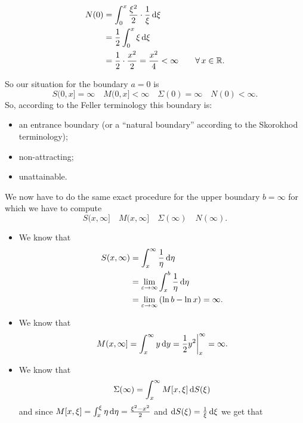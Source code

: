 \documentclass[12pt]{article}
\begin{document}
\begin{enumerate}
\begin{itemize}
			\begin{align*}
				N(0)&=\int_{0}^{x}\frac{\xi^{2}}{2}\cdot\frac{1}{\xi}\mathop{}\!\mathrm{d}\xi\\
				&=\frac{1}{2}\int_{0}^{x}\xi\mathop{}\!\mathrm{d}\xi\\
				&=\frac{1}{2}\cdot\frac{x^{2}}{2}=\frac{x^{2}}{4}<\infty\qquad \forall\, x\in\mathbb{R}.
			\end{align*}
		\end{itemize}
		So our situation for the boundary $a=0$ is
		\begin{equation*}
			S(0,x]=\infty\quad M(0,x]<\infty\quad \Sigma(0)=\infty \quad N(0)<\infty.
		\end{equation*}
		So, according to the Feller terminology this boundary is:
		\begin{itemize}[$\diamond$]
			\item an entrance boundary (or a ``natural boundary'' according to the Skorokhod terminology);
			\item non-attracting;
			\item unattainable.
		\end{itemize}
		We now have to do the same exact procedure for the upper boundary $b=\infty$ for which we have to compute
		\begin{equation*}
			S(x,\infty]\quad M(x,\infty]\quad \Sigma(\infty) \quad N(\infty).
		\end{equation*}
		\begin{itemize}
			\item  We know that 
			\begin{align*}
				S(x,\infty)&=\int_{x}^{\infty}\frac{1}{\eta}\mathop{}\!\mathrm{d}\eta\\
				&=\lim_{\varepsilon\to\infty}\int_{x}^{b}\frac{1}{\eta}\mathop{}\!\mathrm{d}\eta\\
				&=\lim_{\varepsilon\to\infty}\left(\ln b-\ln x\right)=\infty.
			\end{align*}
			\item We know that 
			\begin{equation*}
				M(x,\infty]=\int_{x}^{\infty}y\mathop{}\!\mathrm{d} y=\frac{1}{2} y^{2}\bigg|^{\infty}_{x}=\infty.
			\end{equation*}
			\item We know that
			\begin{equation*}
				\Sigma(\infty)=\int_{x}^{\infty}M[x,\xi]\mathop{}\!\mathrm{d} S(\xi)
			\end{equation*}
			and since $M[x,\xi]=\int_{x}^{\xi}\eta\mathop{}\!\mathrm{d}\eta=\frac{\xi^{2}-x^{2}}{2}$ and $\mathop{}\!\mathrm{d} S(\xi)=\frac{1}{\xi}\mathop{}\!\mathrm{d}\xi$ we get that
			\begin{align*}

\end{align*}
\end{itemize}
\end{enumerate}
\end{document}
